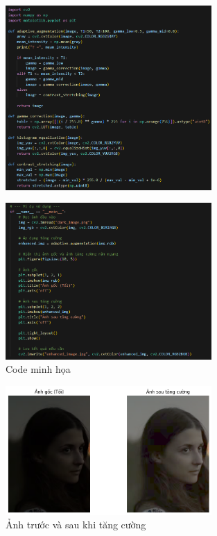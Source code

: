 \begin{itemize}[]
      \begin{figure}[H]
    \centering
    \includegraphics[width=0.7\textwidth]{img/thuattoan-01.png} %
    \label{fig:emotion_distribution}
\end{figure}
  \begin{figure}[H]
    \centering
    \includegraphics[width=0.7\textwidth]{img/thuattoan-02.png} %
    \caption{Code minh họa}
    \label{fig:emotion_distribution}
\end{figure}


    \begin{figure}[H]
    \centering
    \includegraphics[width=0.7\textwidth]{img/anhsautangcuong.png} %
    \caption{Ảnh trước và sau khi tăng cường}
    \label{fig:emotion_distribution}
\end{figure}
\end{itemize}


